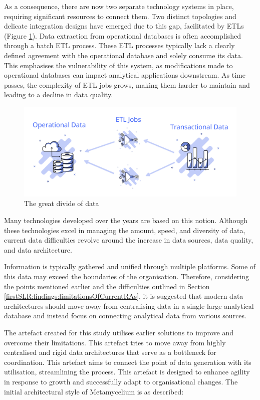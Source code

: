 \documentclass[preprint,12pt]{elsarticle}
\begin{document}
As a consequence, there are now two separate technology systems in place, requiring significant resources to connect them. Two distinct topologies and delicate integration designs have emerged due to this gap, facilitated by ETLs (Figure \ref{fig:dataPlanes}). Data extraction from operational databases is often accomplished through a batch ETL process. These ETL processes typically lack a clearly defined agreement with the operational database and solely consume its data. This emphasises the vulnerability of this system, as modifications made to operational databases can impact analytical applications downstream. As time passes, the complexity of ETL jobs grows, making them harder to maintain and leading to a decline in data quality. 

\begin{figure}[h]
  \includegraphics[width=\textwidth]{images/data-planes.png}
  \caption{The great divide of data}
  \label{fig:dataPlanes}
\end{figure}

Many technologies developed over the years are based on this notion. Although these technologies excel in managing the amount, speed, and diversity of data, current data difficulties revolve around the increase in data sources, data quality, and data architecture. 





Information is typically gathered and unified through multiple platforms. Some of this data may exceed the boundaries of the organisation. Therefore, considering the points mentioned earlier and the difficulties outlined in Section \ref{firstSLR:findings:limitationsOfCurrentRAs}, it is suggested that modern data architectures should move away from centralising data in a single large analytical database and instead focus on connecting analytical data from various sources. 

The artefact created for this study utilises earlier solutions to improve and overcome their limitations. This artefact tries to move away from highly centralised and rigid data architectures that serve as a bottleneck for coordination. This artefact aims to connect the point of data generation with its utilisation, streamlining the process. This artefact is designed to enhance agility in response to growth and successfully adapt to organisational changes. The initial architectural style of Metamycelium is as described: 
\end{document}
